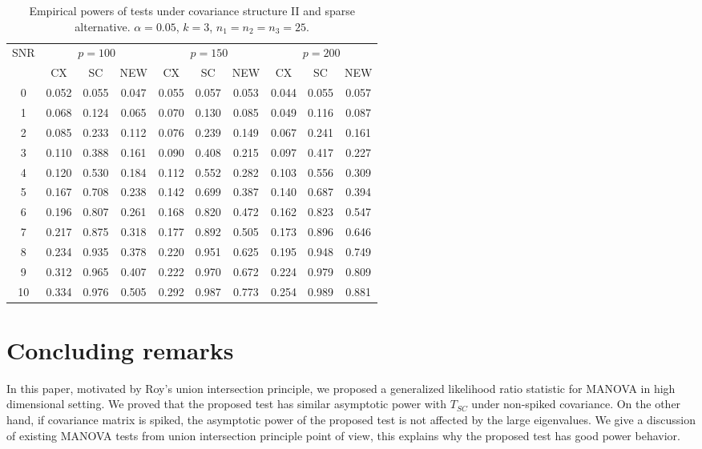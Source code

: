 \documentclass[12pt]{article} %
\theoremstyle{definition}
\begin{document}
\begin{table}[!hbp]
    \caption{Empirical powers of tests under covariance structure II and sparse alternative. $\alpha=0.05$, $k=3$, $n_1=n_2=n_3=25$. }
    \label{table6}
    \centering
\begin{tabular}{*{10}{c}}
\toprule
\multirow{2}{*}{SNR} &\multicolumn{3}{c}{$p=100$}&\multicolumn{3}{c}{$p=150$}&\multicolumn{3}{c}{$p=200$} \\
    \cmidrule(r){2-4}\cmidrule(r){5-7}\cmidrule(r){8-10}
        & CX & SC & NEW & CX &SC &NEW &CX & SC & NEW\\
\midrule
0 & 0.052 & 0.055 & 0.047 & 0.055 & 0.057 & 0.053 & 0.044 & 0.055 & 0.057 \\ 
1 & 0.068 & 0.124 & 0.065 & 0.070 & 0.130 & 0.085 & 0.049 & 0.116 & 0.087 \\ 
2 & 0.085 & 0.233 & 0.112 & 0.076 & 0.239 & 0.149 & 0.067 & 0.241 & 0.161 \\ 
3 & 0.110 & 0.388 & 0.161 & 0.090 & 0.408 & 0.215 & 0.097 & 0.417 & 0.227 \\ 
4 & 0.120 & 0.530 & 0.184 & 0.112 & 0.552 & 0.282 & 0.103 & 0.556 & 0.309 \\ 
5 & 0.167 & 0.708 & 0.238 & 0.142 & 0.699 & 0.387 & 0.140 & 0.687 & 0.394 \\ 
6 & 0.196 & 0.807 & 0.261 & 0.168 & 0.820 & 0.472 & 0.162 & 0.823 & 0.547 \\ 
7 & 0.217 & 0.875 & 0.318 & 0.177 & 0.892 & 0.505 & 0.173 & 0.896 & 0.646 \\ 
8 & 0.234 & 0.935 & 0.378 & 0.220 & 0.951 & 0.625 & 0.195 & 0.948 & 0.749 \\ 
9 & 0.312 & 0.965 & 0.407 & 0.222 & 0.970 & 0.672 & 0.224 & 0.979 & 0.809 \\ 
10 & 0.334 & 0.976 & 0.505 & 0.292 & 0.987 & 0.773 & 0.254 & 0.989 & 0.881 \\ 
\bottomrule
\end{tabular}
\end{table}

\section{Concluding remarks}
In this paper, motivated by Roy's union intersection principle, we proposed a generalized likelihood ratio statistic for MANOVA in high dimensional setting.
We proved that the proposed test has similar asymptotic power with $T_{SC}$ under non-spiked covariance.
On the other hand, if covariance matrix is spiked, the asymptotic power of the proposed test is not affected by the large eigenvalues.
We give a discussion of existing MANOVA tests from union intersection principle point of view, this explains why the proposed test has good power behavior.
\end{document}
